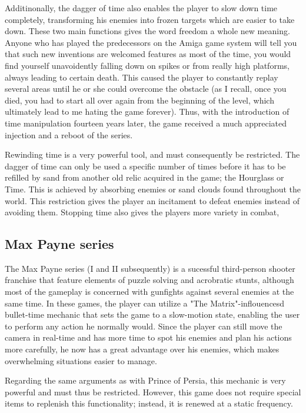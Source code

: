 Additinonally, the dagger of time also enables the player to slow down time completely, transforming his enemies into frozen targets which are easier to take down. These two main 
functions gives the word freedom a whole new meaning. Anyone who has played the predecessors on the Amiga game system will tell you that such new inventions are 
welcomed features as most of the time, you would find yourself unavoidently falling down on spikes or from really high platforms, always leading to certain death. 
This caused the player to constantly replay several areas until he or she could overcome the obstacle (as I recall, once you died, you had to start all over again from the
 beginning of the level, which ultimately lead to me hating the game forever). Thus, with the introduction of time manipulation fourteen years later, the game received a much appreciated injection and a reboot of the series. 

Rewinding time is a very powerful tool, and must consequently be restricted. The dagger of time can only be used a specific number of times before it 
has to be refilled by sand from another old relic acquired in the game; the Hourglass or Time. This is achieved by absorbing enemies or sand clouds found 
throughout the world. This restriction gives the player an incitament to defeat enemies instead of avoiding them. Stopping time also gives the players more variety in combat, 

\subsection{Max Payne series}

The Max Payne series (I and II subsequently) is a sucessful third-person shooter franchise that feature elements of puzzle solving and acrobratic stunts, although most of the gameplay is concerned with gunfights against several enemies at the same time. In these games, the player can utilize a "The Matrix"-inflouencesd bullet-time mechanic that sets the game to a slow-motion state, enabling the user to perform any action he normally would.
Since the player can still move the camera in real-time and has more time to spot his enemies and plan his actions more carefully,
he now has a great advantage over his enemies, which makes overwhelming situations easier to manage.

Regarding the same arguments as with Prince of Persia, this mechanic is very powerful and must thus be restricted. However, this game does not require special items to replenish this functionality; instead, it is renewed at a static frequency.


